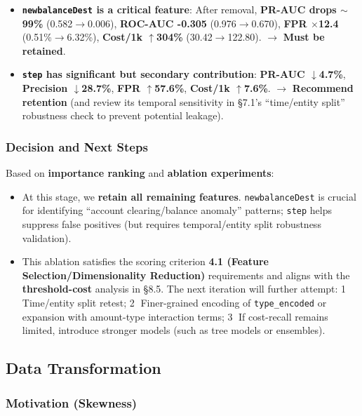 \documentclass[sigplan,screen]{acmart}
\begin{document}
\begin{itemize}
    \item \textbf{\texttt{newbalanceDest} is a critical feature}: After removal, \textbf{PR-AUC drops $\sim$99\%} (0.582$\rightarrow$0.006), \textbf{ROC-AUC -0.305} (0.976$\rightarrow$0.670), \textbf{FPR $\times$12.4} (0.51\%$\rightarrow$6.32\%), \textbf{Cost/1k $\uparrow$304\%} (30.42$\rightarrow$122.80). $\rightarrow$ \textbf{Must be retained}.
    \item \textbf{\texttt{step} has significant but secondary contribution}: \textbf{PR-AUC $\downarrow$4.7\%}, \textbf{Precision $\downarrow$28.7\%}, \textbf{FPR $\uparrow$57.6\%}, \textbf{Cost/1k $\uparrow$7.6\%}. $\rightarrow$ \textbf{Recommend retention} (and review its temporal sensitivity in \S7.1's ``time/entity split'' robustness check to prevent potential leakage).
    \end{itemize}
    
\subsubsection{Decision and Next Steps}

Based on \textbf{importance ranking} and \textbf{ablation experiments}:

    \begin{itemize}
    \item At this stage, we \textbf{retain all remaining features}. \texttt{newbalanceDest} is crucial for identifying ``account clearing/balance anomaly'' patterns; \texttt{step} helps suppress false positives (but requires temporal/entity split robustness validation).
    \item This ablation satisfies the scoring criterion \textbf{4.1 (Feature Selection/Dimensionality Reduction)} requirements and aligns with the \textbf{threshold-cost} analysis in \S8.5. The next iteration will further attempt: \textcircled{1} Time/entity split retest; \textcircled{2} Finer-grained encoding of \texttt{type\_encoded} or expansion with amount-type interaction terms; \textcircled{3} If cost-recall remains limited, introduce stronger models (such as tree models or ensembles).
    \end{itemize}

\subsection{Data Transformation}

\subsubsection{Motivation (Skewness)}
\end{document}

